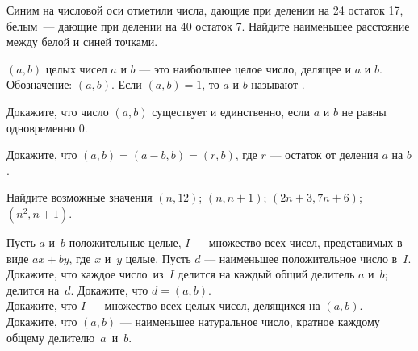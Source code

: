 \documentclass[12pt,a4paper]{article}
\begin{document}
 Синим на числовой оси отметили числа,
дающие при делении на 24 остаток 17, белым~--- дающие
при делении на 40 остаток 7.
Найдите наименьшее расстояние между белой и синей точками.


 $(a,b)$ целых чисел $a$ и $b$
--- это %
наибольшее целое число, делящее и $a$ и $b$.
Обозначение: $(a,b)$. %
Если $(a,b)=1$, то $a$ и $b$ называют .

Докажите, что число $(a,b)$ существует и единственно,
если $a$ и $b$ не равны одновременно 0.




Докажите, что $(a,b)=(a-b,b)=(r,b)$, где $r$ --- остаток
от деления $a$ на $b$.

Найдите возможные значения 
 $(n,12)$;
 $(n,n+1)$;
 $(2n+3,7n+6)$;
 $(n^2,n+1)$.

Пусть $a$ и~$b$ положительные целые, $I$ --- множество всех чисел, представимых в виде $ax+by$, где $x$ и~$y$ целые. Пусть $d$ ---
наименьшее положительное число в~$I$. Докажите, что каждое число~из~$I$
делится на каждый общий делитель $a$ и~$b$;
делится на~$d$.
Докажите, что $d=(a,b)$.\\
 Докажите, что $I$ --- множество всех целых чисел, делящихся на $(a,b)$.\\
 Докажите, что $(a,b)$ --- наименьшее натуральное число, кратное каждому общему делителю~$a$~и~$b$.
\end{document}
